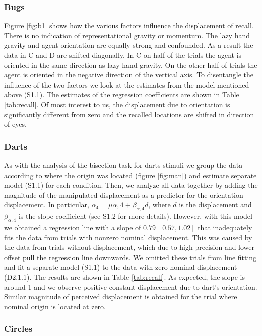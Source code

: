 \documentclass[10pt]{article}
\begin{document}
\subsubsection*{Bugs}
Figure \ref{fig:b1} shows how the various factors influence the displacement of recall. 
There is no indication of representational gravity or momentum. 
The lazy hand gravity and agent orientation are equally strong and confounded. 
As a result the data in C and D are shifted diagonally. 
In C on half of the trials the agent is oriented in the same direction as lazy hand gravity. 
On the other half of trials the agent is oriented in the negative direction of the vertical axis. 
To disentangle the influence of the two factors we look at the estimates from the model mentioned above (S1.1). 
The estimates of the regression coefficients are shown in Table \ref{tab:recall}. 
Of most interest to us, the displacement due to orientation  is significantly different from zero and the recalled locations are shifted in direction of eyes.\\

\subsubsection*{Darts}
As with the analysis of the bisection task for darts stimuli we group the data according to where the origin was located (figure \ref{fig:man}) and estimate separate model (S1.1) for each condition. 
Then, we analyze all data together by adding the magnitude of the manipulated displacement as a predictor for the orientation displacement. 
In particular, $\alpha_4 = \mu{\alpha,4}+ \beta_{\alpha,4}d $, where $d$ is the displacement and $\beta_{\alpha,4}$ is the slope coefficient (see S1.2 for more details). 
However, with this model we obtained a regression line with a slope of $0.79 \; [0.57,1.02]$ that inadequately fits the data from trials with nonzero nominal displacement. 
This was caused by the data from trials without displacement, which due to high precision and lower offset pull the regression line downwards. 
We omitted these trials from line fitting and fit a separate model (S1.1) to the data with zero nominal displacement (D2.1.1). 
The results are shown in Table \ref{tab:recall}. As expected, the slope is around 1 and we observe positive constant displacement due to dart's orientation. 
Similar magnitude of perceived displacement is obtained for the trial where nominal origin is located at zero. 

\subsubsection*{Circles}
\end{document}
